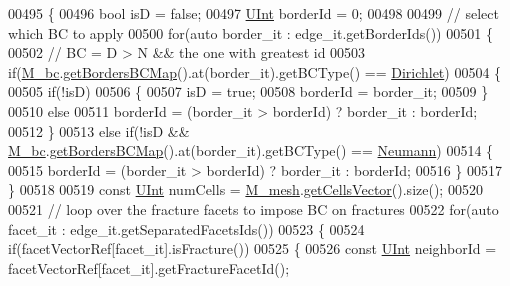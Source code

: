 \begin{DoxyCode}
00495     \{   
00496         \textcolor{keywordtype}{bool} isD = \textcolor{keyword}{false};
00497         \hyperlink{namespaceFVCode3D_a4bf7e328c75d0fd504050d040ebe9eda}{UInt} borderId = 0;
00498         
00499         \textcolor{comment}{// select which BC to apply}
00500         \textcolor{keywordflow}{for}(\textcolor{keyword}{auto} border\_it : edge\_it.getBorderIds())
00501         \{
00502             \textcolor{comment}{// BC = D > N && the one with greatest id}
00503             \textcolor{keywordflow}{if}(\hyperlink{classFVCode3D_1_1global__InnerProduct_a62bbb87bc4710a73980603b8b77ffda8}{M\_bc}.\hyperlink{classFVCode3D_1_1BoundaryConditions_a5b53a81bdab88709fae14892bfe6a7c9}{getBordersBCMap}().at(border\_it).getBCType() == 
      \hyperlink{namespaceFVCode3D_a73660061f11f1671164ce171a053f8c5a192024697bdaa4fbbb39b8961b747bce}{Dirichlet})
00504             \{   
00505                 \textcolor{keywordflow}{if}(!isD)
00506                 \{
00507                     isD = \textcolor{keyword}{true};
00508                     borderId = border\_it;
00509                 \}
00510                 \textcolor{keywordflow}{else}
00511                     borderId = (border\_it > borderId) ? border\_it : borderId;
00512             \}
00513             \textcolor{keywordflow}{else} \textcolor{keywordflow}{if}(!isD && \hyperlink{classFVCode3D_1_1global__InnerProduct_a62bbb87bc4710a73980603b8b77ffda8}{M\_bc}.\hyperlink{classFVCode3D_1_1BoundaryConditions_a5b53a81bdab88709fae14892bfe6a7c9}{getBordersBCMap}().at(border\_it).getBCType() == 
      \hyperlink{namespaceFVCode3D_a73660061f11f1671164ce171a053f8c5a30212425b27314b01b40f4984dbf850a}{Neumann})
00514             \{   
00515                 borderId = (border\_it > borderId) ? border\_it : borderId;
00516                         \}
00517         \}
00518                 
00519                 \textcolor{keyword}{const} \hyperlink{namespaceFVCode3D_a4bf7e328c75d0fd504050d040ebe9eda}{UInt} numCells     = \hyperlink{classFVCode3D_1_1global__Operator_a027911d0f801f6f19a3006329ec30a7f}{M\_mesh}.\hyperlink{classFVCode3D_1_1Rigid__Mesh_afefb62f2c37317402b495e2369ed495b}{getCellsVector}().size();
00520                 
00521         \textcolor{comment}{// loop over the fracture facets to impose BC on fractures}
00522         \textcolor{keywordflow}{for}(\textcolor{keyword}{auto} facet\_it : edge\_it.getSeparatedFacetsIds())
00523         \{        
00524             \textcolor{keywordflow}{if}(facetVectorRef[facet\_it].isFracture())
00525             \{   
00526                 \textcolor{keyword}{const} \hyperlink{namespaceFVCode3D_a4bf7e328c75d0fd504050d040ebe9eda}{UInt} neighborId = facetVectorRef[facet\_it].getFractureFacetId();

\end{DoxyCode}
